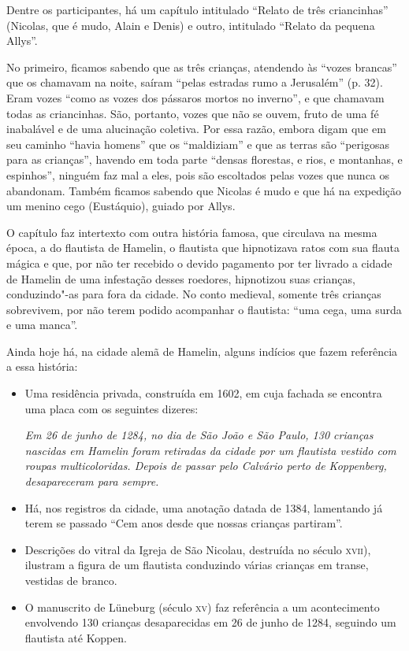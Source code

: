 \documentclass[12pt]{extarticle}
\begin{document}
Dentre os participantes, há um capítulo intitulado ``Relato de três
criancinhas'' (Nicolas, que é mudo, Alain e Denis) e outro, intitulado
``Relato da pequena Allys''.

No primeiro, ficamos sabendo que as três crianças, atendendo às ``vozes
brancas'' que os chamavam na noite, saíram ``pelas estradas rumo a
Jerusalém'' (p. 32). Eram vozes ``como as vozes dos pássaros mortos no
inverno'', e que chamavam todas as criancinhas. São, portanto, vozes que
não se ouvem, fruto de uma fé inabalável e de uma alucinação coletiva.
Por essa razão, embora digam que em seu caminho ``havia homens'' que os
``maldiziam'' e que as terras são ``perigosas para as crianças'',
havendo em toda parte ``densas florestas, e rios, e montanhas, e
espinhos'', ninguém faz mal a eles, pois são escoltados pelas vozes que
nunca os abandonam. Também ficamos sabendo que Nicolas é mudo e que há
na expedição um menino cego (Eustáquio), guiado por Allys.

O capítulo faz intertexto com outra história famosa, que circulava na
mesma época, a do flautista de Hamelin, o flautista que hipnotizava
ratos com sua flauta mágica e que, por não ter recebido o devido
pagamento por ter livrado a cidade de Hamelin de uma infestação desses
roedores, hipnotizou suas crianças, conduzindo"-as para fora da cidade.
No conto medieval, somente três crianças sobrevivem, por não terem
podido acompanhar o flautista: ``uma cega, uma surda e uma manca''.




Ainda hoje há, na cidade alemã de Hamelin, alguns indícios que fazem
referência a essa história:

\begin{itemize}
\item
  Uma residência privada, construída em 1602, em cuja fachada se
  encontra uma placa com os seguintes dizeres:

\emph{Em 26 de junho de 1284, no dia de São João e São Paulo, 130
crianças nascidas em Hamelin foram retiradas da cidade por um flautista
vestido com roupas multicoloridas. Depois de passar pelo Calvário perto
de Koppenberg, desapareceram para sempre.}

\item
  Há, nos registros da cidade, uma anotação datada de 1384, lamentando
  já terem se passado ``Cem anos desde que nossas crianças partiram''.
\item
  Descrições do vitral da Igreja de São Nicolau, destruída no século
  \textsc{xvii}), ilustram a figura de um flautista conduzindo várias crianças em
  transe, vestidas de branco.
\item
  O manuscrito de Lüneburg (século \textsc{xv}) faz referência a um acontecimento
  envolvendo 130 crianças desaparecidas em 26 de junho de 1284, seguindo
  um flautista até Koppen.
\end{itemize}
\end{document}
